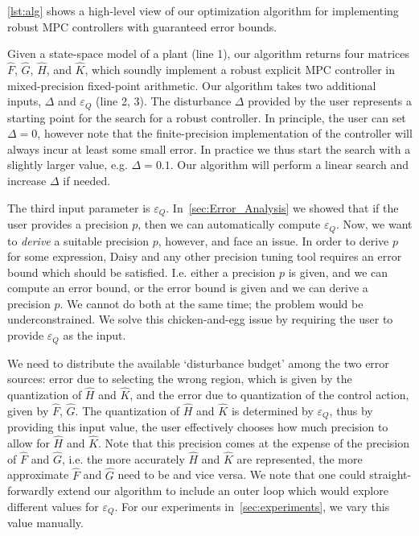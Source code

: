 \autoref{lst:alg} shows a high-level view of our optimization algorithm for
implementing robust MPC controllers with guaranteed error bounds.

Given a state-space model of a plant (line 1), our algorithm returns four matrices
$\hat{F}$, $\hat{G}$, $\hat{H}$, and $\hat{K}$,
which soundly implement a robust explicit MPC controller in mixed-precision
fixed-point arithmetic.
Our algorithm takes two additional inputs, $\Delta$ and $\varepsilon_Q$ (line 2, 3). 
The disturbance $\Delta$ provided by the user represents a starting point for 
the search for a robust controller. In principle, the user can set $\Delta = 0$,
however note that the finite-precision implementation of the controller will always
incur at least some small error. In practice we thus start the search with a slightly
larger value, e.g. $\Delta = 0.1$. Our algorithm will perform a linear search and
increase $\Delta$ if needed.

The third input parameter is $\varepsilon_Q$. In~\autoref{sec:Error_Analysis} we
showed that if the user provides a precision $p$, then we can automatically
compute $\varepsilon_Q$.
Now, we want to \emph{derive} a suitable precision $p$, however, and face an
issue. In order to derive $p$ for some expression, Daisy and any other precision
tuning tool requires an error bound which should be satisfied. I.e. either a
precision $p$ is given, and we can compute an error bound, or the error bound is
given and we can derive a precision $p$. We cannot do both at the same time; the
problem would be underconstrained. We solve this chicken-and-egg issue by
requiring the user to provide $\varepsilon_Q$ as the input. 

We need to distribute the available `disturbance budget' among the two error
sources: error due to selecting the wrong region, which is given by the
quantization of $\hat{H}$ and $\hat{K}$, and the error due to
quantization of the control action, given by $\hat{F}$, $\hat{G}$.
The quantization of $\hat{H}$ and $\hat{K}$ is determined by
$\varepsilon_Q$, thus by providing this input value, the user effectively
chooses how much precision to allow for $\hat{H}$ and $\hat{K}$.
Note that this precision comes at the expense of the precision of
$\hat{F}$ and $\hat{G}$, i.e. the more accurately $\hat{H}$
and $\hat{K}$ are represented, the more approximate $\hat{F}$ and
$\hat{G}$ need to be and vice versa.
We note that one could straight-forwardly extend our algorithm to include an
outer loop which would explore different values for $\varepsilon_Q$. For our
experiments in~\autoref{sec:experiments}, we vary this value manually.


